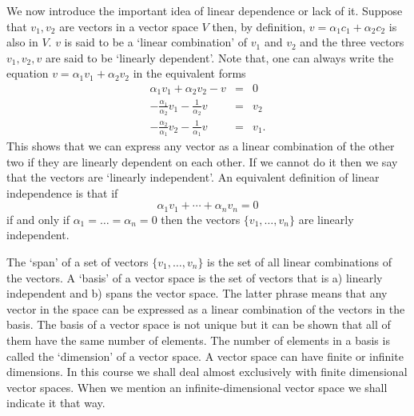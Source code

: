 We now introduce the important idea of linear dependence or lack of it. Suppose
that $v_1, v_2$ are vectors in a vector space $V$ then, by definition, $v = 
\alpha_1 c_1 + \alpha_2c_2$ is also in $V$. $v$ is said to be a `linear
combination' of $v_1$ and $v_2$ and the three vectors $v_1, v_2, v$ are said
to be `linearly dependent'. Note that, one can always write the equation $v =
\alpha_1v_1 + \alpha_2v_2$ in the equivalent forms
\begin{eqnarray*}
\alpha_1 v_1 + \alpha_2 v_2 - v &=& 0 \\
-\frac{\alpha_1}{\alpha_2}v_1 - \frac{1}{\alpha_2}v &=& v_2 \\
-\frac{\alpha_2}{\alpha_1}v_2 - \frac{1}{\alpha_1}v &=& v_1.
\end{eqnarray*}
This shows that we can express any vector as a linear combination of the other 
two if they are linearly dependent on each other. If we cannot do it then we
say that the vectors are `linearly independent'. An equivalent definition of
linear independence is that if
\begin{equation}\label{c1s6e1}
\alpha_1v_1 + \cdots + \alpha_n v_n = 0
\end{equation}
if and only if $\alpha_1 = \ldots = \alpha_n = 0$ then the vectors $\{v_1,
\ldots, v_n\}$ are linearly independent.

The `span' of a set of vectors $\{v_1, \ldots, v_n\}$ is the set of all 
linear combinations of the vectors. A `basis' of a vector space is the set of
vectors that is a) linearly independent and b) spans the vector space. The 
latter phrase means that any vector in the space can be expressed as a linear
combination of the vectors in the basis. The basis of a vector space is not
unique but it can be shown that all of them have the same number of elements.
The number of elements in a basis is called the `dimension' of a vector space.
A vector space can have finite or infinite dimensions. In this course we shall
deal almost exclusively with finite dimensional vector spaces. When we mention
an infinite-dimensional vector space we shall indicate it that way.

